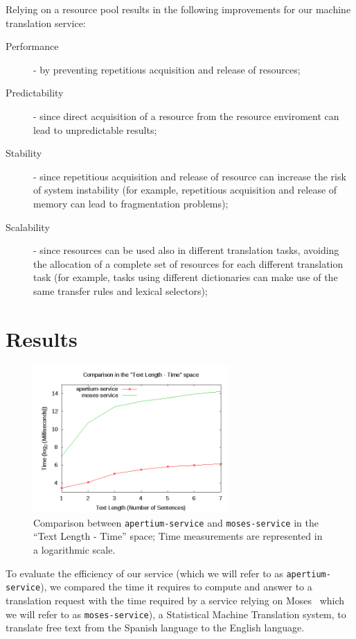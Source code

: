 \documentclass[11pt]{article}
\begin{document}
Relying on a resource pool results in the following improvements for our machine translation service:

\begin{description}
 \item[Performance] - by preventing repetitious acquisition and release of resources;
 \item[Predictability] - since direct acquisition of a resource from the resource enviroment can lead to unpredictable results;
 \item[Stability] - since repetitious acquisition and release of resource can increase the risk of system instability (for example, repetitious
  acquisition and release of memory can lead to fragmentation problems);
 \item[Scalability] - since resources can be used also in different translation tasks, avoiding the allocation of a complete set of resources for each
  different translation task (for example, tasks using different dictionaries can make use of the same transfer rules and lexical selectors);
\end{description}


\section{Results}

\begin{figure}[!ht]
\begin{center}
\includegraphics[width=7.5cm]{comp}
\end{center}
\caption{Comparison between {\tt apertium-service} and {\tt moses-service} in the ``Text Length - Time'' space; Time measurements are represented in a
logarithmic scale.}
\label{fig:comp}
\end{figure}

To evaluate the efficiency of our service (which we will refer to as {\tt apertium-service}), we compared the time it requires to compute and answer to a translation 
request with the time required by a service relying on Moses~\citep{moses} which we will refer to as {\tt moses-service}), a Statistical Machine Translation system, 
to translate free text from the Spanish language to the English language.\\
\end{document}
